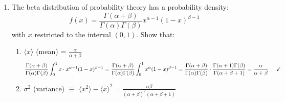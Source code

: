 \documentclass{article}
\begin{document}
\begin{enumerate}
\[\begin{dcases}
    0 & x \leq 0 \end{dcases}\]
    show that:
    \begin{enumerate}
        \item $\langle x \rangle$ (mean) = $\alpha \beta$
        \\
        \[\langle x \rangle = \int_{-\infty}^{0} 0\cdot xdx + \int_{0}^{\infty}\frac{x}{\beta^\alpha\Gamma(\alpha)}x^{\alpha - 1}e^{-\frac x \beta}dx = \frac{1}{\beta^\alpha\Gamma(\alpha)}\int_{0}^{\infty}x^{\alpha}e^{-\frac x \beta}dx \xrightarrow{u = \frac x \beta} \frac{\beta}{\Gamma(\alpha)}\int_{0}^{\infty} u^\alpha e^{-u}du = \alpha \beta \hspace{5mm} \checkmark\]
        \item $\sigma^2$ (variance) $\equiv$ $\langle x ^2 \rangle - \langle x \rangle ^2 = \alpha \beta^2$
        \\
        \[\langle x \rangle ^2 = \alpha^2 \beta^2\]
        \[\langle x^2 \rangle = \int_{0}^{\infty}\frac{x^2}{\beta^\alpha\Gamma(\alpha)}x^{\alpha - 1}e^{-\frac x \beta}dx = \frac{\beta^2}{\Gamma(\alpha)}\int_{0}^{\infty}u^{\alpha + 1}e^{-u}du = \beta^2(\alpha + 1)\alpha\]
        \[\therefore \hspace{5mm} \langle x^2 \rangle - \langle x \rangle ^2 = \alpha^2\beta^2 + \alpha\beta^2 - \alpha^2 \beta^2 = \alpha \beta^2 \hspace{5mm} \checkmark\]
    \end{enumerate}
    \item The beta distribution of probability theory has a probability density:
    \[f(x) = \frac{\Gamma(\alpha + \beta)}{\Gamma(\alpha)\Gamma(\beta)}x^{\alpha - 1}(1-x)^{\beta - 1}\]
    with $x$ restricted to the interval $(0,1)$. Show that:
    \begin{enumerate}
        \item $\langle x \rangle$ (mean) = $\displaystyle \frac{\alpha}{\alpha + \beta}$
        \\
        \[\frac{\Gamma(\alpha + \beta)}{\Gamma(\alpha)\Gamma(\beta)}\int_{0}^{1}x\cdot x^{\alpha - 1}(1-x)^{\beta - 1} = \frac{\Gamma(\alpha + \beta)}{\Gamma(\alpha)\Gamma(\beta)}\int_{0}^{1}x^{\alpha}(1-x)^{\beta - 1} = \frac{\Gamma(\alpha + \beta)}{\Gamma(\alpha)\Gamma(\beta)} \cdot \frac{\Gamma(\alpha + 1)\Gamma(\beta)}{\Gamma(\alpha + \beta + 1)} = \frac{\alpha}{\alpha + \beta} \hspace{5mm} \checkmark\]
        \item $\sigma^2$ (variance) $\equiv$ $\langle x ^2 \rangle - \langle x \rangle ^2 = \displaystyle \frac{\alpha \beta}{(\alpha + \beta)^2(\alpha + \beta + 1)}$

\end{enumerate}
\end{enumerate}
\end{document}
